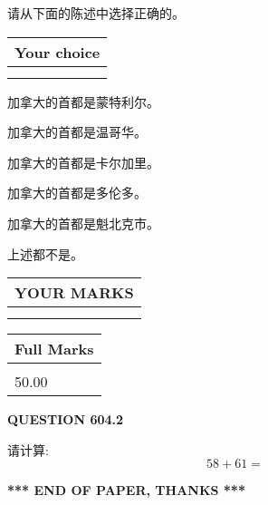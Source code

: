 \documentclass{ctexart}
\begin{document}
  
请从下面的陈述中选择正确的。
  
  
\noindent\hspace{3.0in} \begin{tabular}{|l|}
\hline
Your choice \\
\hline
 \\ 
 \\ 
\hline
\end{tabular}
  
  
 
 
加拿大的首都是蒙特利尔。
 
 
加拿大的首都是温哥华。
 
 
加拿大的首都是卡尔加里。
 
 
加拿大的首都是多伦多。
 
 
加拿大的首都是魁北克市。
 
 
 上述都不是。
 
 
  
\vspace{0.2in}
  
\noindent\begin{tabular}{|l|}
\hline
 YOUR MARKS  \\
\hline
 \\ 
 \\ 
\hline
\end{tabular}
\hspace{0.05in} \begin{tabular}{|l|}
\hline
 Full Marks  \\
\hline
 \\ 
50.00 \\
\hline
\end{tabular}
{\textbf{\Large{QUESTION
604.2 
}}}
  
  
 
请计算:
\begin{equation}
58 +  %
61 = \nonumber
\end{equation}
 

 

 
   
   
 \vspace{0.2in}
 
   
   
   
   
\vspace{1.0in} 
{\textbf{\large{ *** END OF PAPER, THANKS *** }}} 
   
\end{document}
